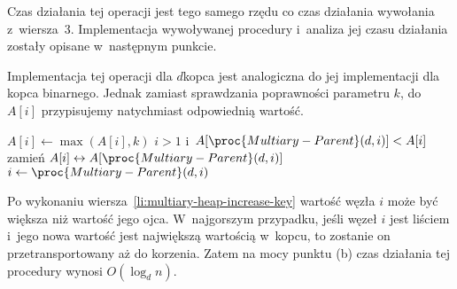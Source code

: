 Czas działania tej operacji jest tego samego rzędu co czas działania wywołania z~wiersza~3.
Implementacja wywoływanej procedury  i~analiza jej czasu działania zostały opisane w~następnym punkcie.

\subproblem %
Implementacja tej operacji dla $d$\nbhyphen kopca jest analogiczna do jej implementacji dla kopca binarnego.
Jednak zamiast sprawdzania poprawności parametru $k$, do $A[i]$ przypisujemy natychmiast odpowiednią wartość.
\begin{codebox}
\li	$A[i]\gets\max(A[i],k)$ \label{li:multiary-heap-increase-key}
\li	\While $i>1$ i~$A[\proc{Multiary-Parent}(d,i)]<A[i]$
\li		\Do zamień $A[i]\leftrightarrow A[\proc{Multiary-Parent}(d,i)]$
\li			$i\gets\proc{Multiary-Parent}(d,i)$
		\End
\end{codebox}

Po wykonaniu wiersza~\ref{li:multiary-heap-increase-key} wartość węzła $i$ może być większa niż wartość jego ojca.
W~najgorszym przypadku, jeśli węzeł $i$ jest liściem i~jego nowa wartość jest największą wartością w~kopcu, to zostanie on przetransportowany aż do korzenia.
Zatem na mocy punktu (b) czas działania tej procedury wynosi $O(\log_dn)$.
